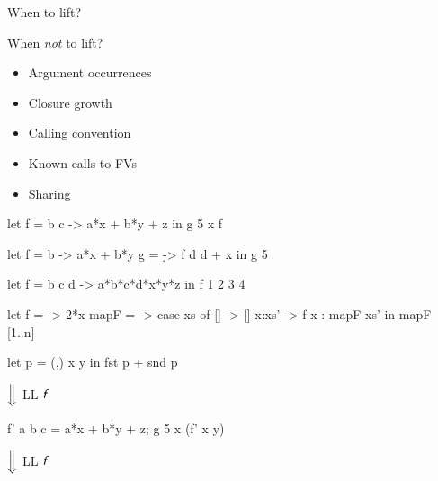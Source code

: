 \documentclass{haskellbeamer}
\newcommand{\id}[1]{\textsf{\textsl{#1}}\xspace}
\newcommand{\idf}{\id{f}}
\begin{document}
\begin{frame}[fragile]{When to lift?}
  \begin{center}
    \begin{minipage}{0.45\textwidth}
      When \emph{not} to lift?
      \begin{itemize}
        \item<3-> Argument occurrences
        \item<6-> Closure growth
        \item<8-> Calling convention
        \item<10-> Known calls to FVs
        \item<12-> Sharing
      \end{itemize}
    \end{minipage}%
    \begin{minipage}{0.55\textwidth}
      \begin{overprint}
        \begin{haskell}
          let f = \a b c -> a*x + b*y + z
          in g 5 x f
        \end{haskell}
        \begin{haskell}
          let f = \a b -> a*x + b*y
              g = \d -> f d d + x
          in g 5
        \end{haskell}
        \begin{haskell}
          let f = \a b c d -> a*b*c*d*x*y*z
          in f 1 2 3 4
        \end{haskell}
        \begin{haskell}
          let f = \x -> 2*x
              mapF = \xs -> case xs of
                []    -> []
                x:xs' -> f x : mapF xs'
          in mapF [1..n]
        \end{haskell}
        \begin{haskell}
          let p = (,) x y
          in fst p + snd p
        \end{haskell}
      \end{overprint}
      \begin{overprint}
        \hspace{0.4\textwidth}$\Big\Downarrow$ LL $\idf$
        \begin{haskell}
          f' a b c = a*x + b*y + z;
          g 5 x (f' x y)
        \end{haskell}
        \hspace{0.4\textwidth}$\Big\Downarrow$ LL $\idf$

\end{overprint}
\end{minipage}
\end{center}
\end{frame}
\end{document}
